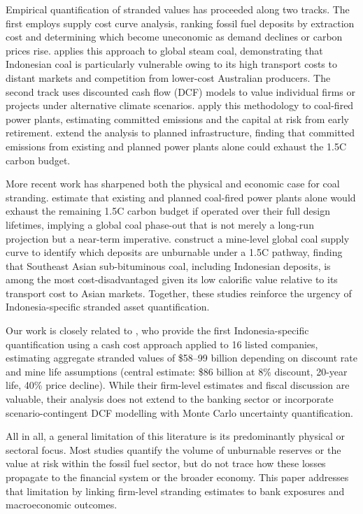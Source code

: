 Empirical quantification of stranded values has proceeded along two tracks. The first employs supply cost curve analysis, ranking fossil fuel deposits by extraction cost and determining which become uneconomic as demand declines or carbon prices rise. \citet{Mendelevitch2019} applies this approach to global steam coal, demonstrating that Indonesian coal is particularly vulnerable owing to its high transport costs to distant markets and competition from lower-cost Australian producers. The second track uses discounted cash flow (DCF) models to value individual firms or projects under alternative climate scenarios. \citet{Edwards2022} apply this methodology to coal-fired power plants, estimating committed emissions and the capital at risk from early retirement. \citet{Pfeiffer2018} extend the analysis to planned infrastructure, finding that committed emissions from existing and planned power plants alone could exhaust the 1.5\textdegree C carbon budget.

More recent work has sharpened both the physical and economic case for coal stranding. \citet{Tong2019} estimate that existing and planned coal-fired power plants alone would exhaust the remaining 1.5\textdegree C carbon budget if operated over their full design lifetimes, implying a global coal phase-out that is not merely a long-run projection but a near-term imperative. \citet{Cui2019} construct a mine-level global coal supply curve to identify which deposits are unburnable under a 1.5\textdegree C pathway, finding that Southeast Asian sub-bituminous coal, including Indonesian deposits, is among the most cost-disadvantaged given its low calorific value relative to its transport cost to Asian markets. Together, these studies reinforce the urgency of Indonesia-specific stranded asset quantification.

Our work is closely related to \citet{sonny2016}, who provide the first Indonesia-specific quantification using a cash cost approach applied to 16 listed companies, estimating aggregate stranded values of \$58--99 billion depending on discount rate and mine life assumptions (central estimate: \$86 billion at 8\% discount, 20-year life, 40\% price decline). While their firm-level estimates and fiscal discussion are valuable, their analysis does not extend to the banking sector or incorporate scenario-contingent DCF modelling with Monte Carlo uncertainty quantification.

All in all, a general limitation of this literature is its predominantly physical or sectoral focus. Most studies quantify the volume of unburnable reserves or the value at risk within the fossil fuel sector, but do not trace how these losses propagate to the financial system or the broader economy. This paper addresses that limitation by linking firm-level stranding estimates to bank exposures and macroeconomic outcomes.

